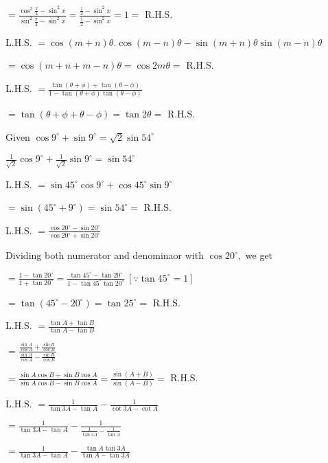   $= \frac{\cos^2\frac{\pi}{4} - \sin^2x}{\sin^2\frac{\pi}{4} - \sin^2x} = \frac{\frac{1}{2} - \sin^2x}{\frac{1}{2} -
  \sin^2x} = 1 =$ R.H.S.

\item L.H.S. $= \cos(m + n)\theta.\cos(m - n)\theta - \sin(m + n)\theta\sin(m - n)\theta$

  $= \cos(m + n + m - n)\theta = \cos2m\theta =$ R.H.S.

\item L.H.S. $= \frac{\tan(\theta + \phi) + \tan(\theta - \phi)}{1 - \tan(\theta + \phi)\tan(\theta - \phi)}$

  $= \tan(\theta + \phi + \theta - \phi) = \tan 2\theta =$ R.H.S.

\item Given $\cos 9^\circ + \sin 9^\circ = \sqrt{2}\sin 54^\circ$

  $\frac{1}{\sqrt{2}}\cos9^\circ + \frac{1}{\sqrt{2}}\sin9^\circ = \sin54^\circ$

  L.H.S. $= \sin45^\circ\cos9^\circ + \cos45^\circ\sin9^\circ$

  $= \sin(45^\circ + 9^\circ) = \sin 54^\circ =$ R.H.S.

\item L.H.S. $= \frac{\cos 20^\circ - \sin 20^\circ}{\cos 20^\circ + \sin 20^\circ}$

  Dividing both numerator and denominaor with $\cos20^\circ,$ we get

  $= \frac{1 - \tan20^\circ}{1 + \tan20^\circ} = \frac{\tan 45^\circ - \tan20^\circ}{1 -
    \tan45^\circ\tan20^\circ}~[\because \tan45^\circ = 1]$

  $= \tan(45^\circ - 20^\circ) = \tan 25^\circ =$ R.H.S.

\item L.H.S. $= \frac{\tan A + \tan B}{\tan A - \tan B}$

  $= \frac{\frac{\sin A}{\cos A} + \frac{\sin B}{\cos B}}{\frac{\sin A}{\cos A} - \frac{\sin B}{\cos B}}$

  $= \frac{\sin A\cos B + \sin B\cos A}{\sin A\cos B - \sin B\cos A} = \frac{\sin(A + B)}{\sin (A - B)} =$ R.H.S.

\item L.H.S. $= \frac{1}{\tan 3A - \tan A} - \frac{1}{\cot 3A - \cot A}$

  $= \frac{1}{\tan 3A - \tan A} - \frac{1}{\frac{1}{\tan 3A} - \frac{1}{\tan A}}$

  $= \frac{1}{\tan 3A - \tan A} - \frac{\tan A\tan 3A}{\tan A - \tan 3A}$

